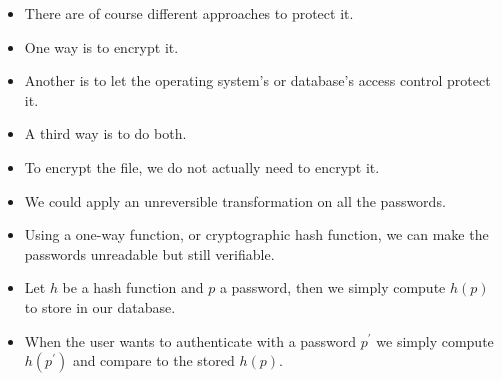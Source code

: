\documentclass{beamer}
\begin{document}
\begin{frame}
  \begin{itemize}
    \item There are of course different approaches to protect it.

    \item One way is to encrypt it.

    \item Another is to let the operating system's or database's access control 
      protect it.

    \item A third way is to do both.

  \end{itemize}
\end{frame}

\begin{frame}
  \begin{itemize}
    \item To encrypt the file, we do not actually need to encrypt it.

    \item We could apply an unreversible transformation on all the passwords.

    \item Using a one-way function, or cryptographic hash function, we can make 
      the passwords unreadable but still verifiable.

    \item Let \(h\) be a hash function and \(p\) a password, then we simply 
      compute \(h(p)\) to store in our database.

    \item When the user wants to authenticate with a password \(p^\prime\) we 
      simply compute \(h(p^\prime)\) and compare to the stored \(h(p)\).

  \end{itemize}
\end{frame}
\end{document}
